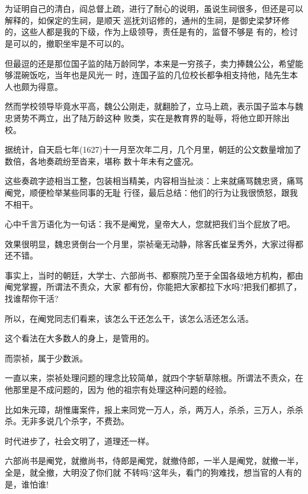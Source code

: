 \documentclass[11pt,a4paper,onecolumn]{article}
\begin{document}
\section[\thesection]{}

为证明自己的清白，阎总督上疏，进行了耐心的说明，虽说生祠很多，但还是可以解释的，如保定的生祠，是顺天
巡抚刘诏修的，通州的生祠，是御史梁梦环修的，这些人都是我的下级，作为上级领导，责任是有的，监督不够是
有的，检讨是可以的，撤职坐牢是不可以的。

但最逗的还是那位国子监的陆万龄同学，本来是一穷孩子，卖力捧魏公公，希望能够混碗饭吃，当年也是风光一
时，连国子监的几位校长都争相支持他，陆先生本人也颇为得意。

然而学校领导毕竟水平高，魏公公刚走，就翻脸了，立马上疏，表示国子监本与魏忠贤势不两立，出了陆万龄这种
败类，实在是教育界的耻辱，将他立即开除出校。

据统计，自天启七年(1627)十一月至次年二月，几个月里，朝廷的公文数量增加了数倍，各地奏疏纷至沓来，堪称
数十年未有之盛况。

这些奏疏字迹相当工整，包装相当精美，内容相当扯淡：上来就痛骂魏忠贤，痛骂阉党，顺便检举某些同事的无耻
行径，最后总结：他们的行为让我很愤怒，跟我不相干。

心中千言万语化为一句话：我不是阉党，皇帝大人，您就把我们当个屁放了吧。

效果很明显，魏忠贤倒台一个月里，崇祯毫无动静，除客氏崔呈秀外，大家过得都还不错。

事实上，当时的朝廷，大学士、六部尚书、都察院乃至于全国各级地方机构，都由阉党掌握，所谓法不责众，大家
都有份，你能把大家都拉下水吗?把我们都抓了，找谁帮你干活?

所以，在阉党同志们看来，该怎么干还怎么干，该怎么活还怎么活。

这个看法在大多数人的身上，是管用的。

而崇祯，属于少数派。

一直以来，崇祯处理问题的理念比较简单，就四个字\myrule 斩草除根。所谓法不责众，在他那里是不成问题的，因为
他的祖宗有处理这种问题的经验。

比如朱元璋，胡惟庸案件，报上来同党一万人，杀，两万人，杀杀，三万人，杀杀杀。无非多说几个杀字，不费劲。

时代进步了，社会文明了，道理还一样。

六部尚书是阉党，就撤尚书，侍郎是阉党，就撤侍郎，一半人是阉党，就撤一半，全是，就全撤，大明没了你们就
不转吗?这年头，看门的狗难找，想当官的人有的是，谁怕谁!

\section[\thesection]{}
\end{document}
